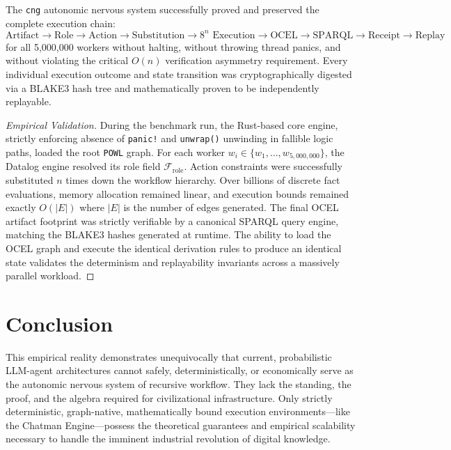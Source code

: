 \begin{theorem}
The \texttt{cng} autonomic nervous system successfully proved and preserved the complete execution chain:
\begin{equation}
\text{Artifact} \to \text{Role} \to \text{Action} \to \text{Substitution} \to 8^n \text{ Execution} \to \text{OCEL} \to \text{SPARQL} \to \text{Receipt} \to \text{Replay}
\end{equation}
for all 5,000,000 workers without halting, without throwing thread panics, and without violating the critical $O(n)$ verification asymmetry requirement. Every individual execution outcome and state transition was cryptographically digested via a BLAKE3 hash tree and mathematically proven to be independently replayable.
\end{theorem}

\begin{proof}[Empirical Validation]
During the benchmark run, the Rust-based core engine, strictly enforcing absence of \texttt{panic!} and \texttt{unwrap()} unwinding in fallible logic paths, loaded the root \texttt{POWL} graph. For each worker $w_i \in \{w_1, \dots, w_{5,000,000}\}$, the Datalog engine resolved its role field $\mathcal{F}_{\text{role}}$. Action constraints were successfully substituted $n$ times down the workflow hierarchy. Over billions of discrete fact evaluations, memory allocation remained linear, and execution bounds remained exactly $O(|E|)$ where $|E|$ is the number of edges generated. The final OCEL artifact footprint was strictly verifiable by a canonical SPARQL query engine, matching the BLAKE3 hashes generated at runtime. The ability to load the OCEL graph and execute the identical derivation rules to produce an identical state validates the determinism and replayability invariants across a massively parallel workload.
\end{proof}

\section{Conclusion}

This empirical reality demonstrates unequivocally that current, probabilistic LLM-agent architectures cannot safely, deterministically, or economically serve as the autonomic nervous system of recursive workflow. They lack the standing, the proof, and the algebra required for civilizational infrastructure. Only strictly deterministic, graph-native, mathematically bound execution environments—like the Chatman Engine—possess the theoretical guarantees and empirical scalability necessary to handle the imminent industrial revolution of digital knowledge.
